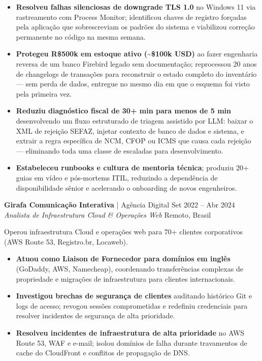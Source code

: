 \documentclass[11pt,a4paper]{article}
\begin{document}
\begin{itemize}[topsep=4pt]
    \item \textbf{Resolveu falhas silenciosas de downgrade TLS 1.0} no Windows 11 via rastreamento com Process Monitor; identificou chaves de registro forçadas pela aplicação que sobrescreviam os padrões do sistema e viabilizou correção permanente no código na mesma semana.
    \item \textbf{Protegeu R\$500k em estoque ativo (\textasciitilde{}\$100k USD)} ao fazer engenharia reversa de um banco Firebird legado sem documentação; reprocessou 20 anos de changelogs de transações para reconstruir o estado completo do inventário --- sem perda de dados, entregue no mesmo dia em que o esquema foi visto pela primeira vez.
    \item \textbf{Reduziu diagnóstico fiscal de 30+ min para menos de 5 min} desenvolvendo um fluxo estruturado de triagem assistido por LLM: baixar o XML de rejeição SEFAZ, injetar contexto de banco de dados e sistema, e extrair a regra específica de NCM, CFOP ou ICMS que causa cada rejeição --- eliminando toda uma classe de escaladas para desenvolvimento.
    \item \textbf{Estabeleceu runbooks e cultura de mentoria técnica}; produziu 20+ guias em vídeo e pós-mortems ITIL, reduzindo a dependência de disponibilidade sênior e acelerando o onboarding de novos engenheiros.
\end{itemize}

\vspace{8pt}
\textbf{Girafa Comunicação Interativa} | Agência Digital \hfill Set 2022 -- Abr 2024 \\
\textit{Analista de Infraestrutura Cloud \& Operações Web} \hfill Remoto, Brasil

Operou infraestrutura Cloud e operações web para 70+ clientes corporativos (AWS Route 53, Registro.br, Locaweb).
\begin{itemize}[topsep=4pt]
    \item \textbf{Atuou como Liaison de Fornecedor para domínios em inglês} (GoDaddy, AWS, Namecheap), coordenando transferências complexas de propriedade e migrações de infraestrutura para clientes internacionais.
    \item \textbf{Investigou brechas de segurança de clientes} auditando histórico Git e logs de acesso; revogou sessões comprometidas e redefiniu credenciais para resolver incidentes de segurança de alta prioridade.
    \item \textbf{Resolveu incidentes de infraestrutura de alta prioridade} no AWS Route 53, WAF e e-mail; isolou domínios de falha durante travamentos de cache do CloudFront e conflitos de propagação de DNS.
\end{itemize}
\end{document}
